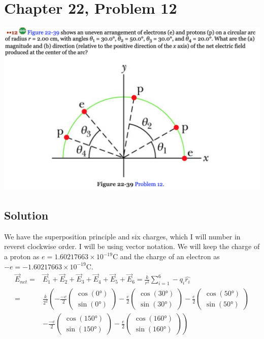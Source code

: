 \documentclass[12pt]{article}
\begin{document}
\section*{Chapter 22, Problem 12}
\includegraphics[width=\textwidth]{picture_6.png}

\subsection*{Solution}
We have the superposition principle and six charges, which I will number in reverst clockwise order. I will be using vector notation. We will keep the charge of a proton as $e = 1.60217663 \times 10^{-19} \unit{\coulomb}$ and the charge of an electron as $-e = -1.60217663 \times 10^{-19} \unit{\coulomb}$.
\begin{align*}
    \vec{E}_{net}   =&  \vec{E}_1 + \vec{E}_2 + \vec{E}_3 + \vec{E}_4 + \vec{E}_5 + \vec{E}_6
        =   \frac{k}{r^2}\sum_{i=1}^{6} - q_i \hat{r_i}\\
        =&  \frac{k}{2^2}\left(-\frac{-e}{2}\begin{pmatrix}\cos(0\unit{\degree})\\ \sin(0\unit{\degree})\end{pmatrix}
            - \frac{e}{2}\begin{pmatrix}\cos(30\unit{\degree})\\ \sin(30\unit{\degree})\end{pmatrix}
            - \frac{e}{2}\begin{pmatrix}\cos(50\unit{\degree})\\ \sin(50\unit{\degree})\end{pmatrix}\right. \\
            & \left. - \frac{-e}{2}\begin{pmatrix}\cos(150\unit{\degree})\\ \sin(150\unit{\degree})\end{pmatrix}
            - \frac{e}{2}\begin{pmatrix}\cos(160\unit{\degree})\\ \sin(160\unit{\degree})\end{pmatrix}\right)
\end{align*}
\end{document}
